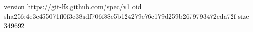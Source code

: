 version https://git-lfs.github.com/spec/v1
oid sha256:4e3e455071ff0f3c38adf706f88e5b124279e76c179d259b2679793472eda72f
size 349692

